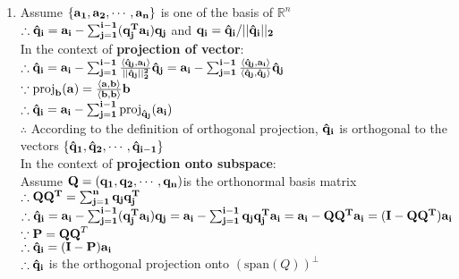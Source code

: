 \documentclass[english,onecolumn]{IEEEtran}
\begin{document}
\begin{enumerate}
    
    \item
    Assume $\{\bf{a_1},\bf{a_2},\cdots,\bf{a_n} \}$ is one of the basis of $\mathbb{R}^n$\\
    $\therefore \bf{\hat{q}_i = a_i} - \sum_{j=1}^{i-1} (\bf{q_j^T a_i})\bf{q_j}$ and $\bf{q_i = \hat{q}_i/ ||\hat{q}_i||_2 }$\\
    In the context of \textbf{projection of vector}:\\
    $\therefore \bf{\hat{q}_i} = \bf{a_i} - \sum_{j=1}^{i-1} \frac{\langle \bf{\hat{q}_j}, \bf{a_i} \rangle}{||\bf{\hat{q}_j}||_2^2} \bf{\hat{q}_j} =  \bf{a_i} - \sum_{j=1}^{i-1} \frac{\langle \bf{\hat{q}_j}, \bf{a_i} \rangle}{\langle \bf{\hat{q}_j}, \bf{\hat{q}_j} \rangle} \bf{\hat{q}_j}$\\
    $\because  \text{proj}_\mathbf{b}(\bf a)=\frac{\langle{\bf a},{\bf b}\rangle}{\langle{\bf b},{\bf b}\rangle}{\bf b} $\\
    $\therefore  \bf{\hat{q}_i}= \bf{a_i} - \sum_{j=1}^{i-1} \text{proj}_{\bf{\hat{q}_j}}(\bf{a_i})$\\
    $\therefore$ According to the definition of orthogonal projection, $\bf{\hat{q}_i}$ is orthogonal to the vectors $\{ \bf{\bf{\hat{q}_1},\bf{\hat{q}_2},\cdots, \bf{\hat{q}_{i-1}}} \}$\\
    In the context of \textbf{projection onto subspace}:\\
    Assume $\bf{Q} = (\bf{q_1},\bf{q_2},\cdots,\bf{q_n})$is the orthonormal basis matrix\\
    $\therefore \bf{Q Q^T} = \sum_{j=1}^{n} \bf{q_j} \bf{q_j^T} $ \\
    $\therefore \bf{\hat{q}_i} = \bf{a_i} - \sum_{j=1}^{i-1} (\bf{q_j^T a_i})\bf{q_j} = \bf{a_i} - \sum_{j=1}^{i-1} \bf{q_j} \bf{q_j^T a_i} = \bf{a_i} -  \bf{Q Q^T a_i} = (\bf{I - Q Q^T}) \bf{a_i}$ \\
    $\because {\bf P} = {\bf QQ}^T$\\
    $\therefore  \bf{\hat{q}_i} = (\bf{I - P}) \bf{a_i} $\\
    $\therefore \bf{\hat{q}_i}$ is the orthogonal projection onto $(\text{span}(Q))^{\perp}$\\
    

\end{enumerate}
\end{document}
